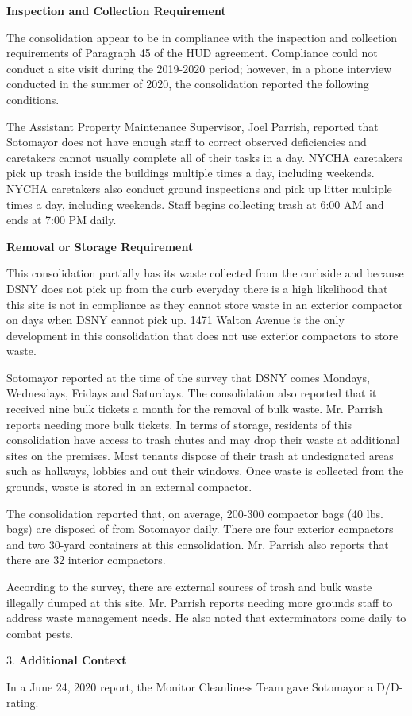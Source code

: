 

\textbf{Inspection and Collection Requirement}

The consolidation appear to be in compliance with the inspection and collection requirements of Paragraph 45 of the HUD agreement. Compliance could not conduct a site visit during the 2019-2020 period; however, in a phone interview conducted in the summer of 2020, the consolidation reported the following conditions.

The Assistant Property Maintenance Supervisor, Joel Parrish, reported that Sotomayor does not have enough staff to correct observed deficiencies and caretakers cannot usually complete all of their tasks in a day. NYCHA caretakers pick up trash inside the buildings multiple times a day, including weekends. NYCHA caretakers also conduct ground inspections and pick up litter multiple times a day, including weekends. Staff begins collecting trash at 6:00 AM and ends at 7:00 PM daily. 

\textbf{Removal or Storage Requirement}

This consolidation partially has its waste collected from the curbside and because DSNY does not pick up from the curb everyday there is a high likelihood that this site is not in compliance as they cannot store waste in an exterior compactor on days when DSNY cannot pick up. 1471 Walton Avenue is the only development in this consolidation that does not use exterior compactors to store waste.

Sotomayor reported at the time of the survey that DSNY comes Mondays, Wednesdays, Fridays and Saturdays. The consolidation also reported that it received nine bulk tickets a month for the removal of bulk waste. Mr. Parrish reports needing more bulk tickets. In terms of storage, residents of this consolidation have access to trash chutes and may drop their waste at additional sites on the premises. Most tenants dispose of their trash at undesignated areas such as hallways, lobbies and out their windows. Once waste is collected from the grounds, waste is stored in an external compactor. 

The consolidation reported that, on average, 200-300 compactor bags (40 lbs. bags) are disposed of from Sotomayor daily. There are four exterior compactors and two 30-yard containers at this consolidation. Mr. Parrish also reports that there are 32 interior compactors.

According to the survey, there are external sources of trash and bulk waste illegally dumped at this site.  Mr. Parrish reports needing more grounds staff to address waste management needs. He also noted that exterminators come daily to combat pests.

3. \textbf{Additional Context} 

In a June 24, 2020 report, the Monitor Cleanliness Team gave Sotomayor a D/D- rating. 